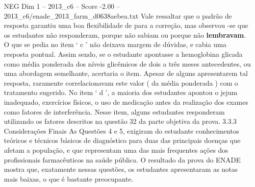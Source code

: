 \begin{textsample}{NEG Dim 1 – 2013\_c6 – Score -2.00 – 2013\_c6/enade\_2013\_farm\_d0638aebea.txt}
Vale ressaltar que o padrão de resposta garantiu uma boa flexibilidade de para a correção, mas observou -se que os estudantes não responderam, porque não sabiam ou porque não \textbf{lembravam}.
O que se pedia no item ‘ c ’ não deixava margem de dúvidas, e cabia uma resposta pontual.
Assim sendo, se o estudante apontasse a hemoglobina glicada como média ponderada dos níveis glicêmicos de dois a três meses antecedentes, ou uma abordagem semelhante, acertaria o item.
Apesar de alguns apresentarem tal resposta, raramente correlacionavam este valor ( da média ponderada ) com o tratamento sugerido.
No item ‘ d ’, a maioria dos estudantes apontou o jejum inadequado, exercícios físicos, o uso de medicação antes da realização dos exames como fatores de interferência.
Nesse item, alguns estudantes responderam utilizando os fatores descritos na questão 32 da parte objetiva da prova. 3.3.3 Considerações Finais As Questões 4 e 5, exigiram do estudante conhecimentos teóricos e técnicos básicos de diagnóstico para duas das principais doenças que afetam a população, e que representam uma das mais frequentes ações dos profissionais farmacêuticos na saúde pública.
O resultado da prova do ENADE mostra que, exatamente nessas questões, os estudantes apresentaram as notas mais baixas, o que é bastante preocupante.

\end{textsample}
